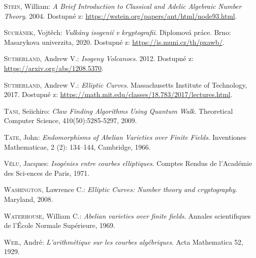 \documentclass[12pt]{report}
\begin{document}
\begin{thebibliography}{97}
\textsc{Stein}, William: \textit{A Brief Introduction to Classical and Adelic Algebraic Number Theory}. 2004. Dostupné z: \url{https://wstein.org/papers/ant/html/node93.html}.


\textsc{Suchánek}, Vojtěch: \textit{Vulkány isogenií v kryptografii}. Diplomová práce. Brno: Masarykova univerzita, 2020. Dostupné z: \url{https://is.muni.cz/th/pxawb/}.

\textsc{Sutherland}, Andrew V.: \textit{Isogeny Volcanoes}. 2012. Dostupné z: \url{https://arxiv.org/abs/1208.5370}.

\textsc{Sutherland}, Andrew V.: \textit{Elliptic Curves}. Massachusetts Institute of Technology, 2017. Dostupné z: \url{https://math.mit.edu/classes/18.783/2017/lectures.html}. 

\textsc{Tani}, Seiichiro: \textit{Claw Finding Algorithms Using Quantum Walk}. Theoretical Computer Science, 410(50):5285-5297, 2009.

\textsc{Tate}, John: \textit{Endomorphisms of Abelian Varieties over Finite Fields}. Inventiones Mathematicae, 2 (2): 134–144, Cambridge, 1966.

\textsc{Vélu}, Jacques: \textit{Isogénies entre courbes elliptiques}. Comptes Rendus de l’Académie des Sci-ences de Paris, 1971. 

\textsc{Washington}, Lawrence C.: \textit{Elliptic Curves: Number theory and cryptography}. Maryland, 2008. 

\textsc{Waterhouse}, William C.: \textit{Abelian varieties over finite fields}. Annales scientifiques de l’École Normale Supérieure, 1969.

\textsc{Weil}, André: \textit{L'arithmétique sur les courbes algébriques}.  Acta Mathematica 52, 1929. 


\end{thebibliography}
\end{document}

